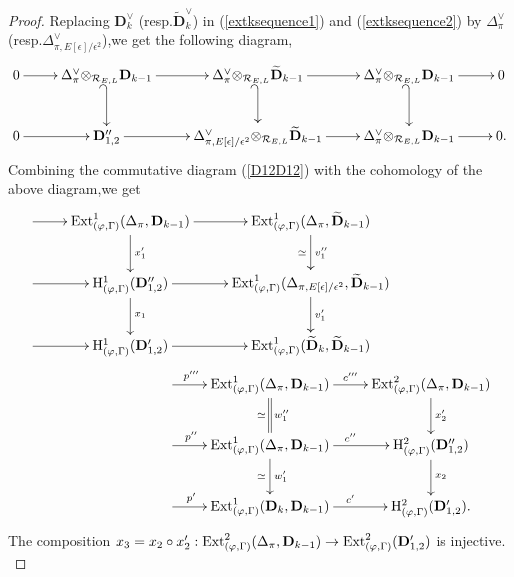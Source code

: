 \documentclass[SecEq,CM,GP]{degruyter-crelle} %
\theoremstyle{plain}
\newcommand{\Dpik}{{\mathbf{D}}}
\newcommand{\ext}{{\rm Ext}}
\newcommand{\hH}{{\mathrm{H}}}
\newcommand{\tee}{{{\otimes}_{\cR_{E,L}}}}
\newcommand{\cR}{\mathcal R}
\begin{document}
\begin{proof}
Replacing $\Dpik_{k}^\vee$ (resp.\;$\widetilde{\Dpik}_{k}^\vee$) in  (\ref{extksequence1}) and (\ref{extksequence2}) by $\Delta_\pi^\vee$ (resp.\;$\Delta_{\pi,E[\epsilon]/\epsilon^2}^\vee$),\;we get the following diagram,\;
\[\xymatrix{0 \ar[r] & \Delta_\pi^\vee\tee \Dpik_{k-1}\ar@{_(->}[d]  \ar[r] & \Delta_\pi^\vee\tee \widetilde{\Dpik}_{k-1}\ar[r] \ar@{_(->}[d]  & \Delta_\pi^\vee\tee \Dpik_{k-1}\ar[r] \ar@{_(->}[d]  & 0\\
	0 \ar[r] & \Dpik_{1,2}'' \ar[r] & \Delta_{\pi,E[\epsilon]/\epsilon^2}^\vee\tee \widetilde{\Dpik}_{k-1}  \ar[r] & \Delta_\pi^\vee\tee \Dpik_{k-1} \ar[r] & 0  .}\]
Combining the commutative diagram (\ref{D12D12}) with the cohomology of the above diagram,\;we get
\begin{equation}
	\begin{aligned}
		&\xymatrix{
			\ar[r] &  \ext^1_{(\varphi,\Gamma)}(\Delta_{\pi},\Dpik_{k-1})  \ar[r] \ar[d]^{x_1'}
			& \ext^1_{(\varphi,\Gamma)}(\Delta_{\pi},\widetilde{\Dpik}_{k-1})   \ar[d]^{v_1''}_{\simeq} \\
			\ar[r] &\hH^1_{(\varphi,\Gamma)}(\Dpik_{1,2}'')   \ar[r] \ar[d]^{x_1}
			& \ext^1_{(\varphi,\Gamma)}(\Delta_{\pi,E[\epsilon]/\epsilon^2},\widetilde{\Dpik}_{k-1})   \ar[d]^{v_1'} \\
			\ar[r] & \hH^1_{(\varphi,\Gamma)}(\Dpik_{1,2}')   \ar[r]
			& \ext^1_{(\varphi,\Gamma)}(\widetilde{\Dpik}_{k},\widetilde{\Dpik}_{k-1}) }\\
		&\hspace{100pt}\xymatrix{  \ar[r]^{p'''\hspace{40pt}}  & \ext^1_{(\varphi,\Gamma)}({\Delta_\pi},\Dpik_{k-1})  \ar[r]^{c'''} \ar@{=}[d]^{w_1''}_{\simeq}  &\ext^2_{(\varphi,\Gamma)}(\Delta_{\pi},\Dpik_{k-1}) \ar[d]^{x_2'}\\
			\ar[r]^{p''\hspace{40pt}}  & \ext^1_{(\varphi,\Gamma)}({\Delta_\pi},\Dpik_{k-1})  \ar[r]^{c''} \ar[d]^{w_1'}_{\simeq} &\hH^2_{(\varphi,\Gamma)}(\Dpik_{1,2}'') \ar[d]^{x_2}\\
			\ar[r]^{p'\hspace{40pt}}  & \ext^1_{(\varphi,\Gamma)}(\Dpik_{k},\Dpik_{k-1})  \ar[r]^{c'}  & \hH^2_{(\varphi,\Gamma)}(\Dpik_{1,2}').}
	\end{aligned}
\end{equation}
 The composition $x_3=x_2\circ x_2':\ext^2_{(\varphi,\Gamma)}({\Delta_\pi},\Dpik_{k-1})\rightarrow\ext^2_{(\varphi,\Gamma)}(\Dpik_{1,2}') $ is injective.\;\\

\end{proof}
\end{document}
